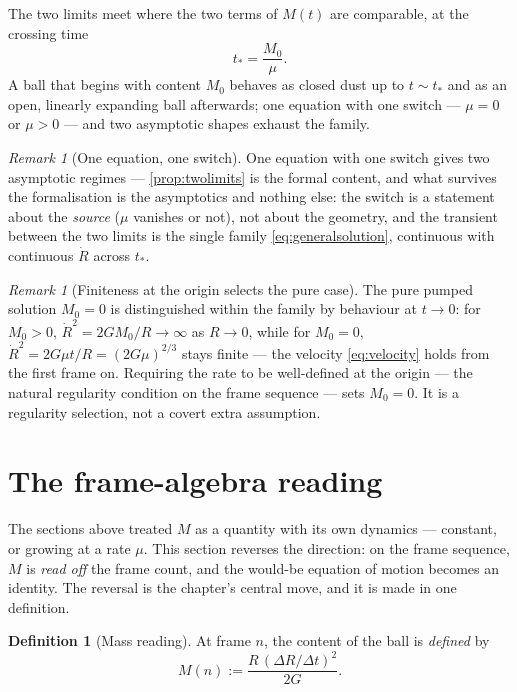 \documentclass[11pt]{amsbook}
\theoremstyle{plain}
\theoremstyle{definition}
\newtheorem{definition}[theorem]{Definition}
\theoremstyle{remark}
\newtheorem{remark}[theorem]{Remark}
\begin{document}
The two limits meet where the two terms of $M(t)$ are comparable, at the crossing time
\begin{equation}\label{eq:crossing}
t_{*} = \frac{M_{0}}{\mu}.
\end{equation}
A ball that begins with content $M_{0}$ behaves as closed dust up to $t \sim t_{*}$ and as an open, linearly expanding ball afterwards; one equation with one switch --- $\mu = 0$ or $\mu > 0$ --- and two asymptotic shapes exhaust the family.

\begin{remark}[One equation, one switch]\label{rem:oneswitch}
One equation with one switch gives two asymptotic regimes --- \cref{prop:twolimits} is the formal content, and what survives the formalisation is the asymptotics and nothing else: the switch is a statement about the \emph{source} ($\mu$ vanishes or not), not about the geometry, and the transient between the two limits is the single family \cref{eq:generalsolution}, continuous with continuous $\dot R$ across $t_{*}$.
\end{remark}

\begin{remark}[Finiteness at the origin selects the pure case]\label{rem:pure}
The pure pumped solution $M_{0} = 0$ is distinguished within the family by behaviour at $t \to 0$: for $M_{0} > 0$, $\dot R^{2} = 2G M_{0}/R \to \infty$ as $R \to 0$, while for $M_{0} = 0$, $\dot R^{2} = 2G\mu t/R = (2G\mu)^{2/3}$ stays finite --- the velocity \cref{eq:velocity} holds from the first frame on. Requiring the rate to be well-defined at the origin --- the natural regularity condition on the frame sequence --- sets $M_{0} = 0$. It is a regularity selection, not a covert extra assumption.
\end{remark}

\section{The frame-algebra reading}\label{sec:frame-readout}

The sections above treated $M$ as a quantity with its own dynamics --- constant, or growing at a rate $\mu$. This section reverses the direction: on the frame sequence, $M$ is \emph{read off} the frame count, and the would-be equation of motion becomes an identity. The reversal is the chapter's central move, and it is made in one definition.

\begin{definition}[Mass reading]\label{def:readout}
At frame $n$, the content of the ball is \emph{defined} by
\begin{equation}\label{eq:readout}
M(n) := \frac{R\,(\Delta R / \Delta t)^{2}}{2G}.
\end{equation}
\end{definition}
\end{document}
